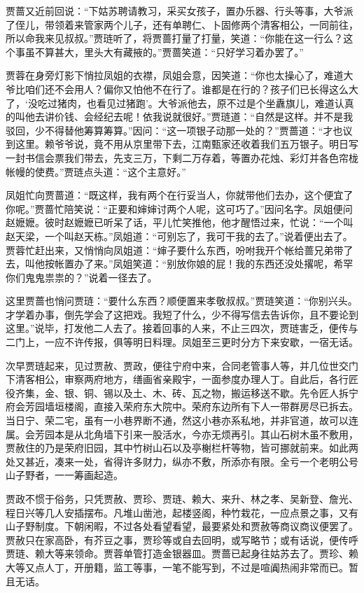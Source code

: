 \documentclass[12pt,oneside]{book}
\begin{document}
贾蔷又近前回说：“下姑苏聘请教习，采买女孩子，置办乐器、行头等事，大爷派了侄儿，带领着来管家两个儿子，还有单聘仁、卜固修两个清客相公，一同前往，所以命我来见叔叔。”贾琏听了，将贾蔷打量了打量，笑道：“你能在这一行么？这个事虽不算甚大，里头大有藏掖的。”贾蔷笑道：“只好学习着办罢了。”

贾蓉在身旁灯影下悄拉凤姐的衣襟，凤姐会意，因笑道：“你也太操心了，难道大爷比咱们还不会用人？偏你又怕他不在行了。谁都是在行的？孩子们已长得这么大了，‘没吃过猪肉，也看见过猪跑’。大爷派他去，原不过是个坐纛旗儿，难道认真的叫他去讲价钱、会经纪去呢！依我说就很好。”贾琏道：“自然是这样。并不是我驳回，少不得替他筹算筹算。”因问：“这一项银子动那一处的？”贾蔷道：“才也议到这里。赖爷爷说，竟不用从京里带下去，江南甄家还收着我们五万银子。明日写一封书信会票我们带去，先支三万，下剩二万存着，等置办花烛、彩灯并各色帘栊帐幔的使费。”贾琏点头道：“这个主意好。”

凤姐忙向贾蔷道：“既这样，我有两个在行妥当人，你就带他们去办，这个便宜了你呢。”贾蔷忙陪笑说：“正要和婶婶讨两个人呢，这可巧了。”因问名字。凤姐便问赵嬷嬷。彼时赵嬷嬷已听呆了话，平儿忙笑推他，他才醒悟过来，忙说：“一个叫赵天梁，一个叫赵天栋。”凤姐道：“可别忘了，我可干我的去了。”说着便出去了。贾蓉忙赶出来，又悄悄向凤姐道：“婶子要什么东西，吩咐我开个帐给蔷兄弟带了去，叫他按帐置办了来。”凤姐笑道：“别放你娘的屁！我的东西还没处撂呢，希罕你们鬼鬼祟祟的？”说着一径去了。

这里贾蔷也悄问贾琏：“要什么东西？顺便置来孝敬叔叔。”贾琏笑道：“你别兴头。才学着办事，倒先学会了这把戏。我短了什么，少不得写信去告诉你，且不要论到这里。”说毕，打发他二人去了。接着回事的人来，不止三四次，贾琏害乏，便传与二门上，一应不许传报，俱等明日料理。凤姐至三更时分方下来安歇，一宿无话。

次早贾琏起来，见过贾赦、贾政，便往宁府中来，合同老管事人等，并几位世交门下清客相公，审察两府地方，缮画省亲殿宇，一面参度办理人丁。自此后，各行匠役齐集，金、银、铜、锡以及土、木、砖、瓦之物，搬运移送不歇。先令匠人拆宁府会芳园墙垣楼阁，直接入荣府东大院中。荣府东边所有下人一带群房尽已拆去。当日宁、荣二宅，虽有一小巷界断不通，然这小巷亦系私地，并非官道，故可以连属。会芳园本是从北角墙下引来一股活水，今亦无烦再引。其山石树木虽不敷用，贾赦住的乃是荣府旧园，其中竹树山石以及亭榭栏杆等物，皆可挪就前来。如此两处又甚近，凑来一处，省得许多财力，纵亦不敷，所添亦有限。全亏一个老明公号山子野者，一一筹画起造。

贾政不惯于俗务，只凭贾赦、贾珍、贾琏、赖大、来升、林之孝、吴新登、詹光、程日兴等几人安插摆布。凡堆山凿池，起楼竖阁，种竹栽花，一应点景之事，又有山子野制度。下朝闲暇，不过各处看望看望，最要紧处和贾赦等商议商议便罢了。贾赦只在家高卧，有芥豆之事，贾珍等或自去回明，或写略节；或有话说，便传呼贾琏、赖大等来领命。贾蓉单管打造金银器皿。贾蔷已起身往姑苏去了。贾珍、赖大等又点人丁，开册籍，监工等事，一笔不能写到，不过是喧阗热闹非常而已。暂且无话。
\end{document}
